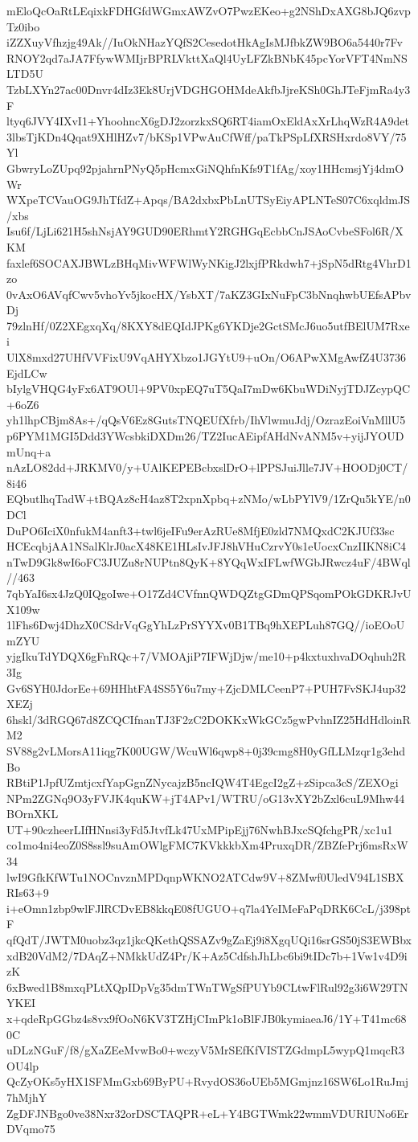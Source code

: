 mEloQcOaRtLEqixkFDHGfdWGmxAWZvO7PwzEKeo+g2NShDxAXG8bJQ6zvpTz0ibo
iZZXuyVfhzjg49Ak//IuOkNHazYQfS2CesedotHkAgIsMJfbkZW9BO6a5440r7Fv
RNOY2qd7aJA7FfywWMIjrBPRLVkttXaQl4UyLFZkBNbK45pcYorVFT4NmNSLTD5U
TzbLXYn27ac00Dnvr4dIz3Ek8UrjVDGHGOHMdeAkfbJjreKSh0GhJTeFjmRa4y3F
ltyq6JVY4IXvI1+YhoohncX6gDJ2zorzkxSQ6RT4iamOxEldAxXrLhqWzR4A9det
3lbsTjKDn4Qqat9XHlHZv7/bKSp1VPwAuCfWff/paTkPSpLfXRSHxrdo8VY/75Yl
GbwryLoZUpq92pjahrnPNyQ5pHcmxGiNQhfnKfs9T1fAg/xoy1HHcmsjYj4dmOWr
WXpeTCVauOG9JhTfdZ+Apqs/BA2dxbxPbLnUTSyEiyAPLNTeS07C6xqldmJS/xbs
Isu6f/LjLi621H5shNsjAY9GUD90ERhmtY2RGHGqEcbbCnJSAoCvbeSFol6R/XKM
faxlef6SOCAXJBWLzBHqMivWFWlWyNKigJ2lxjfPRkdwh7+jSpN5dRtg4VhrD1zo
0vAxO6AVqfCwv5vhoYv5jkocHX/YsbXT/7aKZ3GIxNuFpC3bNnqhwbUEfsAPbvDj
79zlnHf/0Z2XEgxqXq/8KXY8dEQIdJPKg6YKDje2GctSMcJ6uo5utfBElUM7Rxei
UlX8mxd27UHfVVFixU9VqAHYXbzo1JGYtU9+uOn/O6APwXMgAwfZ4U3736EjdLCw
bIylgVHQG4yFx6AT9OUl+9PV0xpEQ7uT5QaI7mDw6KbuWDiNyjTDJZcypQC+6oZ6
yh1lhpCBjm8As+/qQsV6Ez8GutsTNQEUfXfrb/IhVlwmuJdj/OzrazEoiVnMllU5
p6PYM1MGI5Ddd3YWcsbkiDXDm26/TZ2IucAEipfAHdNvANM5v+yijJYOUDmUnq+a
nAzLO82dd+JRKMV0/y+UAlKEPEBcbxslDrO+lPPSJuiJlle7JV+HOODj0CT/8i46
EQbutlhqTadW+tBQAz8cH4az8T2xpnXpbq+zNMo/wLbPYlV9/1ZrQu5kYE/n0DCl
DuPO6IciX0nfukM4anft3+twl6jeIFu9erAzRUe8MfjE0zld7NMQxdC2KJUf33sc
HCEcqbjAA1NSalKlrJ0acX48KE1HLsIvJFJ8hVHuCzrvY0s1eUocxCnzIIKN8iC4
nTwD9Gk8wI6oFC3JUZu8rNUPtn8QyK+8YQqWxIFLwfWGbJRwcz4uF/4BWql//463
7qbYaI6sx4JzQ0IQgoIwe+O17Zd4CVfnnQWDQZtgGDmQPSqomPOkGDKRJvUX109w
1lFhs6Dwj4DhzX0CSdrVqGgYhLzPrSYYXv0B1TBq9hXEPLuh87GQ//ioEOoUmZYU
yjgIkuTdYDQX6gFnRQc+7/VMOAjiP7IFWjDjw/me10+p4kxtuxhvaDOqhuh2R3Ig
Gv6SYH0JdorEe+69HHhtFA4SS5Y6u7my+ZjcDMLCeenP7+PUH7FvSKJ4up32XEZj
6hskl/3dRGQ67d8ZCQCIfnanTJ3F2zC2DOKKxWkGCz5gwPvhnIZ25HdHdloinRM2
SV88g2vLMorsA11iqg7K00UGW/WcuWl6qwp8+0j39cmg8H0yGfLLMzqr1g3ehdBo
RBtiP1JpfUZmtjcxfYapGgnZNycajzB5ncIQW4T4EgcI2gZ+zSipca3cS/ZEXOgi
NPm2ZGNq9O3yFVJK4quKW+jT4APv1/WTRU/oG13vXY2bZxl6cuL9Mhw44BOrnXKL
UT+90czheerLIfHNnsi3yFd5JtvfLk47UxMPipEjj76NwhBJxcSQfchgPR/xc1u1
co1mo4ni4eoZ0S8ssl9suAmOWlgFMC7KVkkkbXm4PruxqDR/ZBZfePrj6msRxW34
lwI9GfkKfWTu1NOCnvznMPDqnpWKNO2ATCdw9V+8ZMwf0UledV94L1SBXRIs63+9
i+eOmn1zbp9wlFJlRCDvEB8kkqE08fUGUO+q7la4YeIMeFaPqDRK6CcL/j398ptF
qfQdT/JWTM0uobz3qz1jkcQKethQSSAZv9gZaEj9i8XgqUQi16srGS50jS3EWBbx
xdB20VdM2/7DAqZ+NMkkUdZ4Pr/K+Az5CdfshJhLbc6bi9tIDc7b+1Vw1v4D9izK
6xBwed1B8mxqPLtXQpIDpVg35dmTWnTWgSfPUYb9CLtwFlRul92g3i6W29TNYKEI
x+qdeRpGGbz4s8vx9fOoN6KV3TZHjCImPk1oBlFJB0kymiaeaJ6/1Y+T41mc680C
uDLzNGuF/f8/gXaZEeMvwBo0+wczyV5MrSEfKfVISTZGdmpL5wypQ1mqcR3OU4lp
QcZyOKs5yHX1SFMmGxb69ByPU+RvydOS36oUEb5MGmjnz16SW6Lo1RuJmj7hMjhY
ZgDFJNBgo0ve38Nxr32orDSCTAQPR+eL+Y4BGTWmk22wmmVDURIUNo6ErDVqmo75
